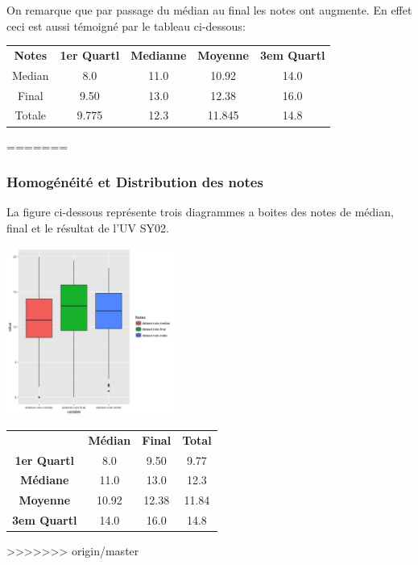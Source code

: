 \documentclass[]{report}
\begin{document}
On remarque que par passage du médian au final les notes ont augmente. En effet ceci est aussi témoigné par le tableau ci-dessous:

\begin{center}
	\begin{tabular}{c c c c c }
		\textbf{Notes} & \textbf{1er Quartl} & \textbf{Medianne}   & \textbf{Moyenne} & \textbf{3em Quartl} \\
		Median  & 8.0 			& 11.0		 & 10.92      & 14.0\\
		Final      & 9.50 		  & 13.0 	   & 12.38	    & 16.0\\
		Totale   & 9.775        & 12.3       &  11.845    & 14.8\\
	\end{tabular}
\end{center} 
=======

\subsubsection{Homogénéité et Distribution des notes}
La figure ci-dessous représente trois diagrammes a boites des notes de médian, final et le résultat de l'UV SY02. 

\begin{minipage}{.4\textwidth}	
	\includegraphics[width=55mm]{Figures/Notes/boxplot_exam.jpg}
	\label{fig:Boxplot_notes}
\end{minipage}%
\hspace{0.03\linewidth}
\begin{minipage}{.6\textwidth}
	\begin{tabular}{ c c c c }
		\textbf{}       & \textbf{Médian} & \textbf{Final}   & \textbf{Total} \\
		\textbf{1er Quartl}    & 8.0 			       & 9.50		      & 9.77    \\
		\textbf{Médiane  }   &11.0		             & 13.0	            & 12.3    \\
		\textbf{Moyenne}     & 10.92                &  12.38          & 11.84\\
		\textbf{3em Quartl}  & 14.0  				& 16.0 		       & 14.8\\
	\end{tabular}
\end{minipage}
>>>>>>> origin/master
\end{document}

